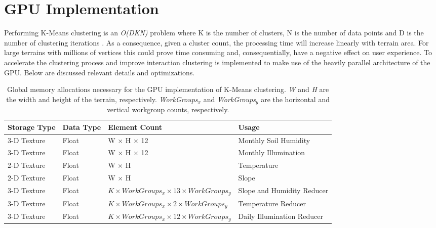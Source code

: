 \section{GPU Implementation} \label{sec:gpu_clustering}

Performing K-Means clustering is an \textit{O(DKN)} problem where K is the number of clusters, N is the number of data points and D is the number of clustering iterations \cite{Xu2005}. As a consequence, given a cluster count, the processing time will increase linearly with terrain area. For large terrains with millions of vertices this could prove time consuming and, consequentially, have a negative effect on user experience. To accelerate the clustering process and improve interaction clustering is implemented to make use of the heavily parallel architecture of the GPU. Below are discussed relevant details and optimizations. \\

\begin{table}[]
  \centering
	    \begin{tabular}{|p{3cm}|p{1.5cm}|p{6cm}|p{5cm}|}
		\hline	
  	    \textbf{Storage Type} &  \textbf{Data Type} & \textbf{Element Count} & \textbf{Usage} \\
		\hline
		3-D Texture & Float & W $\times$ H $\times$ 12 & Monthly Soil Humidity \\
		\hline
		3-D Texture & Float & W $\times$ H $\times$ 12 & Monthly Illumination \\
		\hline
		2-D Texture & Float & W $\times$ H & Temperature \\
		\hline
		2-D Texture & Float & W $\times$ H & Slope \\
		\hline
		3-D Texture & Float & $ \textit{K} \times WorkGroups_{x} \times 13 \times WorkGroups_{y} $ &  Slope and Humidity Reducer \\
		\hline
		3-D Texture & Float & $ \textit{K} \times WorkGroups_{x} \times 2 \times WorkGroups_{y} $ &  Temperature Reducer \\
		\hline
		3-D Texture & Float & $ \textit{K} \times WorkGroups_{x} \times 12 \times WorkGroups_{y} $ & Daily Illumination Reducer \\
		\hline
		\end{tabular}
		\caption{Global memory allocations necessary for the GPU implementation of K-Means clustering. \textit{W} and \textit{H} are the width and height of the terrain, respectively. \textit{WorkGroups$_{x}$} and \textit{WorkGroups$_{y}$} are the horizontal and vertical workgroup counts, respectively.}
	  \label{tab:clustering_mem_allocs}
\end{table}

